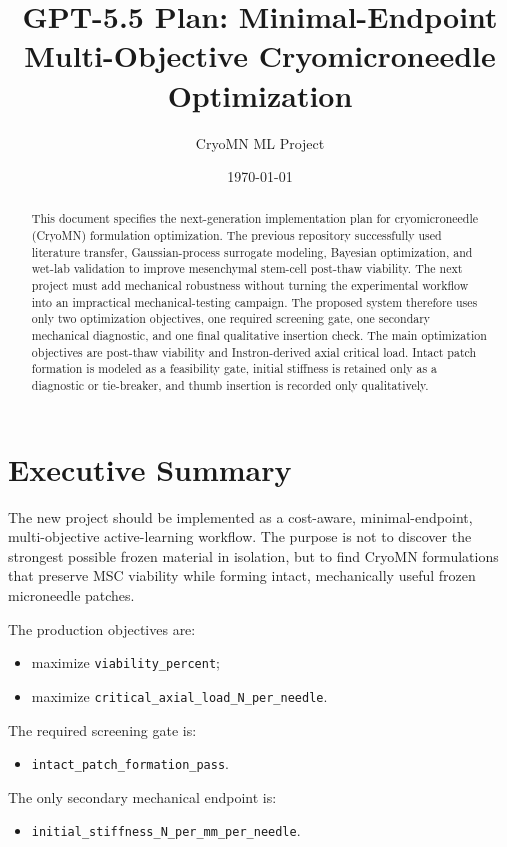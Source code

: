 \documentclass[11pt]{article}
\title{GPT-5.5 Plan: Minimal-Endpoint Multi-Objective Cryomicroneedle Optimization}
\author{CryoMN ML Project}
\date{\today}
\newcommand{\metric}[1]{\texttt{#1}}
\begin{document}
\maketitle

\begin{abstract}
This document specifies the next-generation implementation plan for cryomicroneedle
(CryoMN) formulation optimization. The previous repository successfully used
literature transfer, Gaussian-process surrogate modeling, Bayesian optimization, and
wet-lab validation to improve mesenchymal stem-cell post-thaw viability. The next
project must add mechanical robustness without turning the experimental workflow into
an impractical mechanical-testing campaign. The proposed system therefore uses only
two optimization objectives, one required screening gate, one secondary mechanical
diagnostic, and one final qualitative insertion check. The main optimization objectives
are post-thaw viability and Instron-derived axial critical load. Intact patch formation
is modeled as a feasibility gate, initial stiffness is retained only as a diagnostic or
tie-breaker, and thumb insertion is recorded only qualitatively.
\end{abstract}

\section{Executive Summary}

The new project should be implemented as a cost-aware, minimal-endpoint,
multi-objective active-learning workflow. The purpose is not to discover the strongest
possible frozen material in isolation, but to find CryoMN formulations that preserve MSC
viability while forming intact, mechanically useful frozen microneedle patches.

The production objectives are:
\begin{itemize}
    \item maximize \metric{viability\_percent};
    \item maximize \metric{critical\_axial\_load\_N\_per\_needle}.
\end{itemize}

The required screening gate is:
\begin{itemize}
    \item \metric{intact\_patch\_formation\_pass}.
\end{itemize}

The only secondary mechanical endpoint is:
\begin{itemize}
    \item \metric{initial\_stiffness\_N\_per\_mm\_per\_needle}.
\end{itemize}
\end{document}
